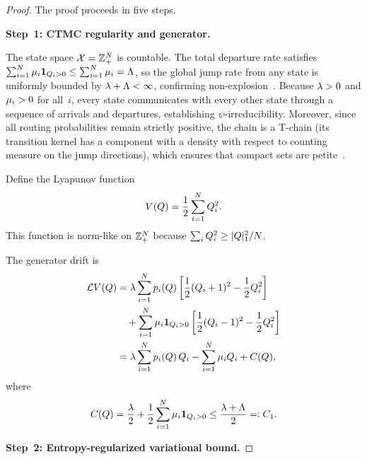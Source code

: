 \begin{proof}
The proof proceeds in five steps.

\medskip
\noindent\textbf{Step~1: CTMC regularity and generator.}

The state space $\mathcal{X} = \mathbb{Z}_+^N$ is countable. The total departure rate satisfies $\sum_{i=1}^N \mu_i \mathbf{1}_{Q_{i}>0} \le \sum_{i=1}^N \mu_i = \Lambda$, so the global jump rate from any state is uniformly bounded by $\lambda + \Lambda < \infty$, confirming non-explosion~\cite[Theorem~2.7.1]{norris1997markov}. Because $\lambda > 0$ and $\mu_i > 0$ for all~$i$, every state communicates with every other state through a sequence of arrivals and departures, establishing $\psi$-irreducibility. Moreover, since all routing probabilities remain strictly positive, the chain is a T-chain (its transition kernel has a component with a density with respect to counting measure on the jump directions), which ensures that compact sets are petite~\cite[Theorem~4.6]{meyn2009markov}.

Define the Lyapunov function
\begin{equation}
\label{eq:softmax_lyapunov}
V(Q) = \frac{1}{2} \sum_{i=1}^{N} Q_{i}^2.
\end{equation}
This function is norm-like on $\mathbb{Z}_+^N$ because $\sum_i Q_i^2 \geq |Q|_1^2 / N$.

The generator drift is
\begin{align}
\mathcal{L} V(Q)
&= \lambda \sum_{i=1}^{N} p_{i}(Q) \left[\frac{1}{2}(Q_{i}+1)^2 - \frac{1}{2}Q_{i}^2\right] \nonumber \\
&\quad + \sum_{i=1}^{N} \mu_i \mathbf{1}_{Q_{i}>0} \left[\frac{1}{2}(Q_{i}-1)^2 - \frac{1}{2}Q_{i}^2\right] \nonumber \\
&= \lambda \sum_{i=1}^{N} p_{i}(Q)\, Q_{i}
  - \sum_{i=1}^{N} \mu_i Q_{i}
  + C(Q),
\label{eq:softmax_generator}
\end{align}
where
\begin{equation}
\label{eq:softmax_C}
C(Q) = \frac{\lambda}{2} + \frac{1}{2}\sum_{i=1}^{N} \mu_i \mathbf{1}_{Q_{i}>0}
\leq \frac{\lambda + \Lambda}{2} =\mathrel{\mathop:} C_1.
\end{equation}

\medskip
\noindent\textbf{Step~2: Entropy-regularized variational bound.}


\end{proof}
